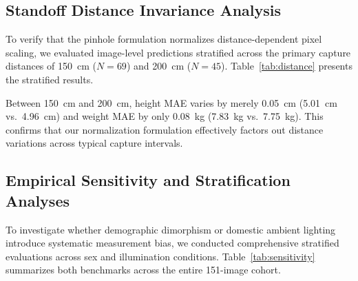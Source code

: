 \documentclass[conference]{IEEEtran}
\begin{document}
\subsection{Standoff Distance Invariance Analysis}
To verify that the pinhole formulation normalizes distance-dependent pixel scaling, we evaluated image-level predictions stratified across the primary capture distances of 150~cm ($N=69$) and 200~cm ($N=45$). Table~\ref{tab:distance} presents the stratified results.

\begin{table}[t]
\caption{Stratified Standoff Distance Robustness Analysis}
\label{tab:distance}
\centering
{}
\end{table}

Between 150~cm and 200~cm, height MAE varies by merely 0.05~cm (5.01~cm vs.~4.96~cm) and weight MAE by only 0.08~kg (7.83~kg vs.~7.75~kg). This confirms that our normalization formulation effectively factors out distance variations across typical capture intervals.

\subsection{Empirical Sensitivity and Stratification Analyses}
To investigate whether demographic dimorphism or domestic ambient lighting introduce systematic measurement bias, we conducted comprehensive stratified evaluations across sex and illumination conditions. Table~\ref{tab:sensitivity} summarizes both benchmarks across the entire 151-image cohort.
\end{document}

